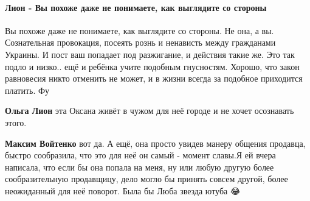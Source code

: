  
 
 
 
 
\paragraph{Лион - Вы похоже даже не понимаете, как выглядите со стороны}

\begin{itemize}
 

Вы похоже даже не понимаете, как выглядите со стороны. Не она, а вы.
Сознательная провокация, посеять рознь и ненависть между гражданами Украины. И
пост ваш попадает под разжигание, и действия такие же. Это так подло и низко..
ещё и ребёнка учите подобным гнусностям. Хорошо, что закон равновесия никто
отменить не может, и в жизни всегда за подобное приходится платить. Фу

\begin{itemize}
 
\textbf{Ольга Лион} эта Оксана живёт в чужом для неё городе и не хочет осознавать этого.

 
\textbf{Максим Войтенко} вот да. А ещё, она просто увидев манеру общения
продавца, быстро сообразила, что это для неё он самый - момент славы.Я ей вчера
написала, что если бы она попала на меня, ну или любую другую более
сообразительную продавщицу, дело могло бы принять совсем другой, более
неожиданный для неё поворот. Была бы Люба звезда ютуба 😂


\end{itemize}
\end{itemize}
